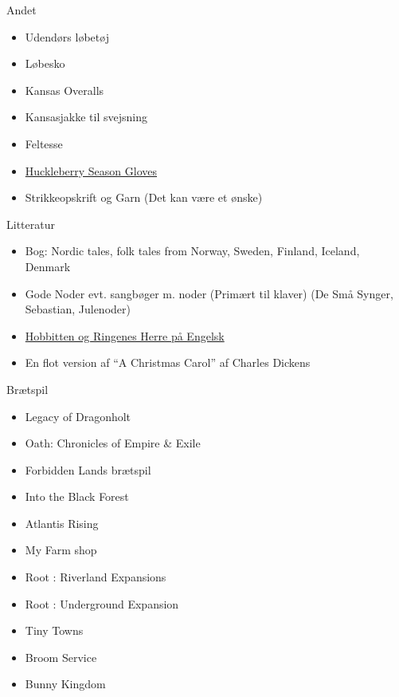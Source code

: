 Andet

\begin{itemize}
\tightlist
\item
  Udendørs løbetøj
\item
  Løbesko
\item
  Kansas Overalls
\item
  Kansasjakke til svejsning
\item
  Feltesse
\item
  \href{https://huckberry.com/store/giver/category/p/44207-4-season-glove-w-wax-coating}{Huckleberry
  Season Gloves}
\item
  Strikkeopskrift og Garn (Det kan være et ønske)
\end{itemize}

Litteratur

\begin{itemize}
\tightlist
\item
  Bog: Nordic tales, folk tales from Norway, Sweden, Finland, Iceland,
  Denmark
\item
  Gode Noder evt. sangbøger m. noder (Primært til klaver) (De Små
  Synger, Sebastian, Julenoder)
\item
  \href{https://www.saxo.com/dk/the-hobbit-the-lord-of-the-rings-boxed-set_hardback_9780008376109}{Hobbitten
  og Ringenes Herre på Engelsk}
\item
  En flot version af ``A Christmas Carol'' af Charles Dickens
\end{itemize}

Brætspil

\begin{itemize}
\tightlist
\item
  Legacy of Dragonholt
\item
  Oath: Chronicles of Empire \& Exile
\item
  Forbidden Lands brætspil
\item
  Into the Black Forest
\item
  Atlantis Rising
\item
  My Farm shop
\item
  Root : Riverland Expansions
\item
  Root : Underground Expansion
\item
  Tiny Towns
\item
  Broom Service
\item
  Bunny Kingdom
\end{itemize}
